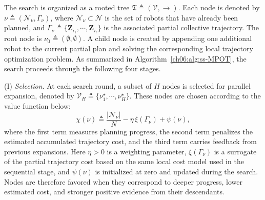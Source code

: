 The search is organized as a rooted tree
$\mathfrak{T}\triangleq (\mathcal{V},\rightarrow)$.
Each node is denoted by
$\nu\triangleq (\mathcal{N}_\nu,\Gamma_\nu)$, where
$\mathcal{N}_\nu\subset\mathcal{N}$ is the set of robots that have
already been planned, and
$\Gamma_\nu\triangleq
\{\mathbf{Z}_{i_1},\cdots,\mathbf{Z}_{i_\ell}\}$ is the associated
partial collective trajectory.
The root node is
$\nu_0\triangleq (\emptyset,\emptyset)$.
A child node is created by appending one additional robot to the current
partial plan and solving the corresponding local trajectory optimization
problem.
As summarized in Algorithm~\ref{ch06:alg:ss-MPOT}, the search proceeds
through the following four stages.

(I) \emph{Selection}.
At each search round, a subset of $H$ nodes is selected for parallel
expansion, denoted by
$\mathcal{V}_H\triangleq \{\nu_1^\star,\cdots,\nu_H^\star\}$.
These nodes are chosen according to the value function below:
\begin{equation}
\label{ch06:eq:value}
\chi(\nu)\triangleq
\frac{|\mathcal{N}_\nu|}{N}
-\eta\,\xi(\Gamma_\nu)
+\psi(\nu),
\end{equation}
where the first term measures planning progress, the second term
penalizes the estimated accumulated trajectory cost, and the third term
carries feedback from previous expansions.
Here $\eta>0$ is a weighting parameter,
$\xi(\Gamma_\nu)$ is a surrogate of the partial trajectory cost based on
the same local cost model used in the sequential stage, and
$\psi(\nu)$ is initialized at zero and updated during the search.
Nodes are therefore favored when they correspond to deeper progress,
lower estimated cost, and stronger positive evidence from their
descendants. 

